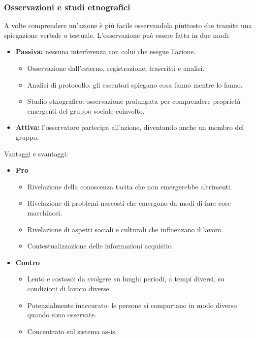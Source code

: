 \documentclass[../main.tex]{subfiles}
\begin{document}
\subsubsection{Osservazioni e studi etnografici}
A volte comprendere un'azione è più facile osservandola piuttosto che tramite una spiegazione verbale o testuale.
L'osservazione può essere fatta in due modi:
\begin{itemize}
	\item \textbf{Passiva:} nessuna interferenza con colui che esegue l'azione.
	\begin{itemize}
		\item Osservazione dall'esterno, registrazione, trascritti e analisi.
		\item Analisi di protocollo: gli esecutori spiegano cosa fanno mentre lo fanno.
		\item Studio etnografico: osservazione prolungata per comprendere proprietà emergenti del gruppo sociale coinvolto.
	\end{itemize}
	\item \textbf{Attiva:} l'osservatore partecipa all'azione, diventando anche un membro del gruppo.
\end{itemize}
Vantaggi e svantaggi:
\begin{itemize}
	\item \textbf{Pro}
	\begin{itemize}
		\item Rivelazione della conoscenza tacita che non emergerebbe altrimenti.
		\item Rivelazione di problemi nascosti che emergono da modi di fare cose macchinosi.
		\item Rivelazione di aspetti sociali e culturali che influenzano il lavoro.
		\item Contestualizzazione delle informazioni acquisite.
		\end{itemize}
	\item \textbf{Contro}
	\begin{itemize}
		\item Lento e costoso: da svolgere su lunghi periodi, a tempi diversi, su condizioni di lavoro diverse.
		\item Potenzialmente inaccurato: le persone si comportano in modo diverso quando sono osservate.
		\item Concentrato sul sistema as-is.
	\end{itemize}
\end{itemize}
\end{document}
